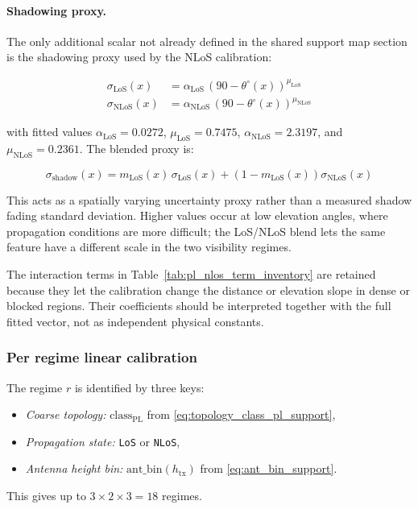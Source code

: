 \paragraph{Shadowing proxy.}
The only additional scalar not already defined in the shared support map
section is the shadowing proxy used by the NLoS calibration:

\begin{align}
\sigma_{\mathrm{LoS}}(x) &= \alpha_{\mathrm{LoS}}\,(90-\theta^\circ(x))^{\mu_{\mathrm{LoS}}}
\label{eq:sigma_los_v2}\\
\sigma_{\mathrm{NLoS}}(x) &= \alpha_{\mathrm{NLoS}}\,(90-\theta^\circ(x))^{\mu_{\mathrm{NLoS}}}
\label{eq:sigma_nlos_v2}
\end{align}

with fitted values $\alpha_{\mathrm{LoS}} = 0.0272$, $\mu_{\mathrm{LoS}}
= 0.7475$, $\alpha_{\mathrm{NLoS}} = 2.3197$, and
$\mu_{\mathrm{NLoS}} = 0.2361$. The blended proxy is:

\begin{equation}
\sigma_{\mathrm{shadow}}(x)=
m_{\mathrm{LoS}}(x)\,\sigma_{\mathrm{LoS}}(x)
+\left(1-m_{\mathrm{LoS}}(x)\right)\sigma_{\mathrm{NLoS}}(x)
\label{eq:sigma_blend}
\end{equation}

This acts as a spatially varying uncertainty proxy rather than a measured
shadow fading standard deviation. Higher values occur at low elevation angles,
where propagation conditions are more difficult; the LoS/NLoS blend lets the
same feature have a different scale in the two visibility regimes.

The interaction terms in Table~\ref{tab:pl_nlos_term_inventory} are retained
because they let the calibration change the distance or elevation slope in
dense or blocked regions. Their coefficients should be interpreted together
with the full fitted vector, not as independent physical constants.

\subsubsection{Per regime linear calibration}

The regime \(r\) is identified by three keys:
\begin{itemize}
\item \emph{Coarse topology:} \(\mathrm{class}_{\mathrm{PL}}\) from
      \eqref{eq:topology_class_pl_support},
\item \emph{Propagation state:} \texttt{LoS} or \texttt{NLoS},
\item \emph{Antenna height bin:} \(\mathrm{ant\_bin}(h_{\mathrm{tx}})\)
      from \eqref{eq:ant_bin_support}.
\end{itemize}
This gives up to \(3 \times 2 \times 3 = 18\) regimes.

